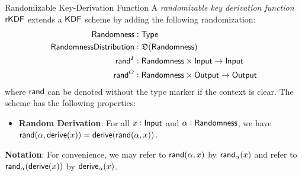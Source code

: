 \begin{definitiontoc}{Randomizable Key-Derivation Function}
    A \emph{randomizable key derivation function} ${\textsf{rKDF}}$ extends a ${\textsf{KDF}}$ scheme by adding the following randomization:
    \begin{align*}
        {\textsf{Randomness}}             &: {\textsf{Type}} \\
        {\textsf{RandomnessDistribution}} &: \mathfrak{D}({\textsf{Randomness}}) \\
        {\textsf{rand}}^I                 &: {\textsf{Randomness}} \times {\textsf{Input}} \to {\textsf{Input}} \\
        {\textsf{rand}}^O                 &: {\textsf{Randomness}} \times {\textsf{Output}} \to {\textsf{Output}}
    \end{align*}
    where ${\textsf{rand}}$ can be denoted without the type marker if the context is clear. The scheme has the following properties:
    \begin{itemize}
        \item \textbf{Random Derivation}: For all $x : {\textsf{Input}}$ and $\alpha : {\textsf{Randomness}}$, we have ${\textsf{rand}}(\alpha, {\textsf{derive}}(x)) = {\textsf{derive}}({\textsf{rand}}(\alpha, x))$.
    \end{itemize}

    \textbf{Notation}: For convenience, we may refer to ${\textsf{rand}}(\alpha, x)$ by ${\textsf{rand}}_\alpha(x)$ and refer to ${\textsf{rand}}_\alpha({\textsf{derive}}(x))$ by ${\textsf{derive}}_\alpha(x)$.
\end{definitiontoc}

